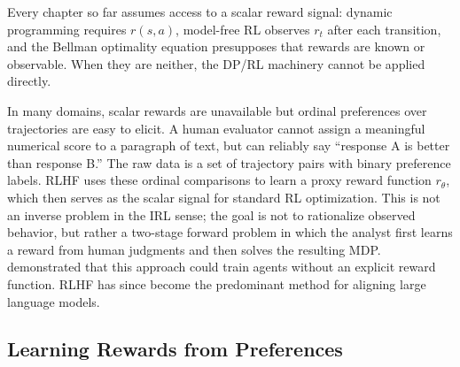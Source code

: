Every chapter so far assumes access to a scalar reward signal: dynamic programming requires $r(s,a)$, model-free RL observes $r_t$ after each transition, and the Bellman optimality equation presupposes that rewards are known or observable. When they are neither, the DP/RL machinery cannot be applied directly.

In many domains, scalar rewards are unavailable but ordinal preferences over trajectories are easy to elicit. A human evaluator cannot assign a meaningful numerical score to a paragraph of text, but can reliably say ``response A is better than response B.'' The raw data is a set of trajectory pairs with binary preference labels. RLHF uses these ordinal comparisons to learn a proxy reward function $r_\theta$, which then serves as the scalar signal for standard RL optimization. This is not an inverse problem in the IRL sense; the goal is not to rationalize observed behavior, but rather a two-stage forward problem in which the analyst first learns a reward from human judgments and then solves the resulting MDP. \citet{christiano:2017} demonstrated that this approach could train agents without an explicit reward function. RLHF has since become the predominant method for aligning large language models.

\subsection{Learning Rewards from Preferences}


